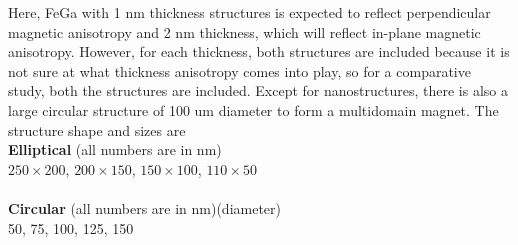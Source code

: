 \documentclass[12pt,a4paper,bold]{thesis}
\theoremstyle{thm}
\theoremstyle{definition}
\begin{document}
Here, FeGa with 1 nm thickness structures is expected to reflect perpendicular magnetic anisotropy and 2 nm thickness, which will reflect in-plane magnetic anisotropy. However, for each thickness, both structures are included because it is not sure at what thickness anisotropy comes into play, so for a comparative study, both the structures are included. Except for nanostructures, there is also a large circular structure of 100 um diameter to form a multidomain magnet.
The structure shape and sizes are\\
\textbf{Elliptical} (all numbers are in nm)\\
$250\times200$, $200\times150$, $150\times100$, $110\times50$\\\\
\textbf{Circular} (all numbers are in nm)(diameter)\\
50, 75, 100, 125, 150
\end{document}

